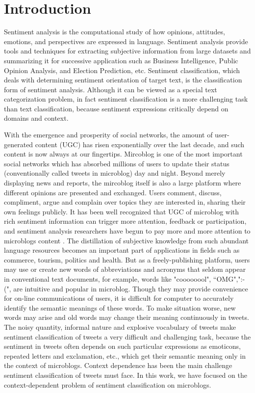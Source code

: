 \documentclass{llncs}
\begin{document}
\section{Introduction}
\label{intro}
Sentiment analysis is the computational study of how opinions, attitudes, emotions, and perspectives are expressed in language. 
Sentiment analysis provide tools and techniques for extracting subjective information from large datasets and summarizing it for successive application such as Business Intelligence, Public Opinion Analysis, and Election Prediction, etc\cite{xsongx:b1}. 
Sentiment classification, which deals with determining sentiment orientation of target text, is the classification form of sentiment analysis\cite{xsongx:b2}. 
Although it can be viewed as a special text categorization problem, in fact sentiment classification is a more challenging task than text classification, because sentiment expressions critically depend on domains and context\cite{xsongx:b6}.

With the emergence and prosperity of social networks, the amount of user-generated content (UGC) has risen exponentially over the last decade, and such content is now always at our fingertips.
Mircoblog is one of the most important social networks which has absorbed millions of users to update their status (conventionally called tweets in microblog) day and night.
Beyond merely displaying news and reports, the mircoblog itself is also a large platform where different opinions are presented and exchanged. 
Users comment, discuss, compliment, argue and complain over topics they are interested in, sharing their own feelings publicly. 
It has been well recognized that UGC of microblog with rich sentiment information can trigger more attention, feedback or participation, and sentiment analysis researchers have begun to pay more and more attention to microblogs content \cite{DBLP:conf/hicss/StieglitzD12}.
The distillation of subjective knowledge from such abundant language resources becomes an important part of applications in fields such as commerce, tourism, politics and health. 
But as a freely-publishing platform, users may use or create new words of abbreviations and acronyms that seldom appear in conventional text documents, for example, words like "coooooool", “OMG",":-(", are intuitive and popular in microblog.
Though they may provide convenience for on-line communications of users, it is difficult for computer to accurately identify the semantic meanings of these words. 
To make situation worse, new words may arise and old words may change their meaning continuously in tweets.
The noisy quantity, informal nature and explosive vocabulary of tweets make sentiment classification of tweets a very difficult and challenging task, because the sentiment in tweets often depends on such particular expressions as emoticons, repeated letters and exclamation, etc., which get their semantic meaning only in the context of microblogs. 
Context dependence has been the main challenge sentiment classification of tweets must face.
In this work, we have focused on the context-dependent problem of sentiment classification on microblogs. 
\end{document}

